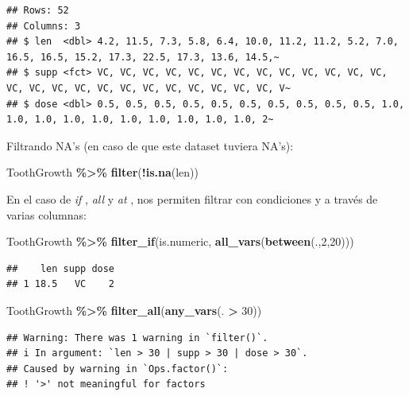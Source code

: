 \documentclass[
]{book}
\newenvironment{Shaded}{\begin{snugshade}}{\end{snugshade}}
\newcommand{\DecValTok}[1]{\textcolor[rgb]{0.00,0.00,0.81}{#1}}
\newcommand{\FunctionTok}[1]{\textcolor[rgb]{0.13,0.29,0.53}{\textbf{#1}}}
\newcommand{\NormalTok}[1]{#1}
\newcommand{\SpecialCharTok}[1]{\textcolor[rgb]{0.81,0.36,0.00}{\textbf{#1}}}
\begin{document}
\begin{verbatim}
## Rows: 52
## Columns: 3
## $ len  <dbl> 4.2, 11.5, 7.3, 5.8, 6.4, 10.0, 11.2, 11.2, 5.2, 7.0, 16.5, 16.5, 15.2, 17.3, 22.5, 17.3, 13.6, 14.5,~
## $ supp <fct> VC, VC, VC, VC, VC, VC, VC, VC, VC, VC, VC, VC, VC, VC, VC, VC, VC, VC, VC, VC, VC, VC, VC, VC, VC, V~
## $ dose <dbl> 0.5, 0.5, 0.5, 0.5, 0.5, 0.5, 0.5, 0.5, 0.5, 0.5, 1.0, 1.0, 1.0, 1.0, 1.0, 1.0, 1.0, 1.0, 1.0, 1.0, 2~
\end{verbatim}

\hfill\break
Filtrando NA's (en caso de que este dataset tuviera NA's):

\begin{Shaded}
\begin{Highlighting}[]
\NormalTok{ToothGrowth }\SpecialCharTok{\%\textgreater{}\%} \FunctionTok{filter}\NormalTok{(}\SpecialCharTok{!}\FunctionTok{is.na}\NormalTok{(len))}
\end{Highlighting}
\end{Shaded}

\hfill\break
En el caso de \emph{if} , \emph{all} y \emph{at} , nos permiten filtrar con condiciones y a través de varias columnas:

\begin{Shaded}
\begin{Highlighting}[]
\NormalTok{ToothGrowth }\SpecialCharTok{\%\textgreater{}\%} \FunctionTok{filter\_if}\NormalTok{(is.numeric, }\FunctionTok{all\_vars}\NormalTok{(}\FunctionTok{between}\NormalTok{(.,}\DecValTok{2}\NormalTok{,}\DecValTok{20}\NormalTok{)))}
\end{Highlighting}
\end{Shaded}

\begin{verbatim}
##    len supp dose
## 1 18.5   VC    2
\end{verbatim}

\begin{Shaded}
\begin{Highlighting}[]
\NormalTok{ToothGrowth }\SpecialCharTok{\%\textgreater{}\%} \FunctionTok{filter\_all}\NormalTok{(}\FunctionTok{any\_vars}\NormalTok{(. }\SpecialCharTok{\textgreater{}} \DecValTok{30}\NormalTok{))}
\end{Highlighting}
\end{Shaded}

\begin{verbatim}
## Warning: There was 1 warning in `filter()`.
## i In argument: `len > 30 | supp > 30 | dose > 30`.
## Caused by warning in `Ops.factor()`:
## ! '>' not meaningful for factors
\end{verbatim}
\end{document}

